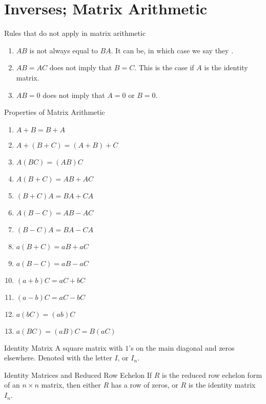 \documentclass[\main/notes.tex]{subfiles}
\begin{document}
		\section{Inverses; Matrix Arithmetic}
			\begin{sidenote}{Rules that do not apply in matrix arithmetic}
				\begin{enumerate}[label=(\alph*)]
					\item $AB$ is not always equal to $BA$. It can be, in which case we say they .
					\item $AB = AC$ does not imply that $B = C$. This is the case if $A$ is the identity matrix.
					\item $AB = 0$ does not imply that $A = 0$ or $B = 0$.
				\end{enumerate}
			\end{sidenote}
			\begin{sidenote}{Properties of Matrix Arithmetic}
				\begin{enumerate}[label=(\alph*)]
					\item $A + B = B + A$
					\item $A + (B + C) = (A + B) + C$
					\item $A(BC) = (AB)C$
					\item $A(B + C) = AB + AC$
					\item $(B + C)A = BA + CA$
					\item $A(B - C) = AB - AC$
					\item $(B - C)A = BA - CA$
					\item $a(B + C) = aB + aC$
					\item $a(B - C) = aB - aC$
					\item $(a + b)C = aC + bC$
					\item $(a - b)C = aC - bC$
					\item $a(bC) = (ab)C$
					\item $a(BC) = (aB)C = B(aC)$
				\end{enumerate}
			\end{sidenote}
			\begin{definition}{Identity Matrix}
				A square matrix with $1$'s on the main diagonal and zeros elsewhere. Denoted with the letter $I$, or $I_{n}$.
			\end{definition}
			\begin{theorem}{Identity Matrices and Reduced Row Echelon}
				If $R$ is the reduced row echelon form of an $n \times n$ matrix, then either $R$ has a row of zeros, or $R$ is the identity matrix $I_{n}$.
			\end{theorem}
\end{document}

